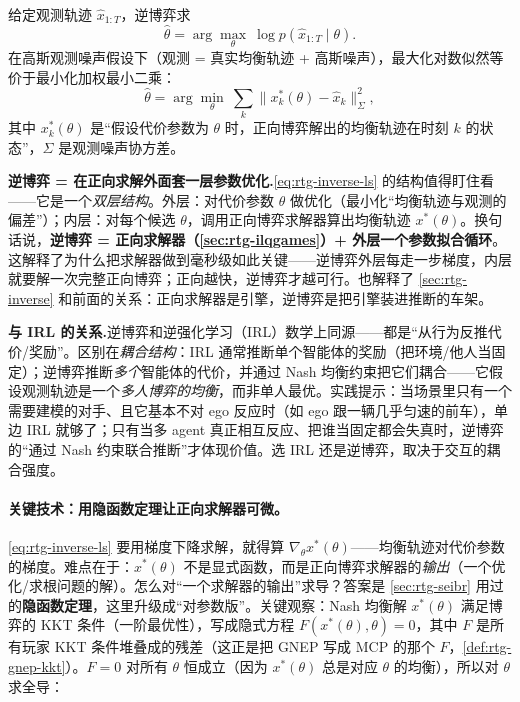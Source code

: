 \begin{definition}[逆博弈的最大似然形式]\label{def:rtg-inverse-mle}
给定观测轨迹 $\hat x_{1:T}$，逆博弈求
\begin{equation}
  \hat\theta=\arg\max_\theta\ \log p(\hat x_{1:T}\mid\theta).
  \label{eq:rtg-mle}
\end{equation}
在高斯观测噪声假设下（观测 = 真实均衡轨迹 + 高斯噪声），最大化对数似然等价于最小化加权最小二乘：
\begin{equation}
  \hat\theta=\arg\min_\theta\ \sum_k\big\lVert x_k^*(\theta)-\hat x_k\big\rVert_\Sigma^2,
  \label{eq:rtg-inverse-ls}
\end{equation}
其中 $x_k^*(\theta)$ 是“假设代价参数为 $\theta$ 时，正向博弈解出的均衡轨迹在时刻 $k$ 的状态”，$\Sigma$ 是观测噪声协方差。
\end{definition}

\begin{insight}
\textbf{逆博弈 = 在正向求解外面套一层参数优化.}\;\cref{eq:rtg-inverse-ls} 的结构值得盯住看——它是一个\emph{双层结构}。外层：对代价参数 $\theta$ 做优化（最小化“均衡轨迹与观测的偏差”）；内层：对每个候选 $\theta$，调用正向博弈求解器算出均衡轨迹 $x^*(\theta)$。换句话说，\textbf{逆博弈 = 正向求解器（\cref{sec:rtg-ilqgames}）+ 外层一个参数拟合循环}。这解释了为什么把求解器做到毫秒级如此关键——逆博弈外层每走一步梯度，内层就要解一次完整正向博弈；正向越快，逆博弈才越可行。也解释了 \cref{sec:rtg-inverse} 和前面的关系：正向求解器是引擎，逆博弈是把引擎装进推断的车架。
\end{insight}

\begin{note}
\textbf{与 IRL 的关系.}\;逆博弈和逆强化学习（IRL）数学上同源——都是“从行为反推代价/奖励”。区别在\emph{耦合结构}：IRL 通常推断单个智能体的奖励（把环境/他人当固定）；逆博弈推断\emph{多个}智能体的代价，并通过 Nash 均衡约束把它们耦合——它假设观测轨迹是一个\emph{多人博弈的均衡}，而非单人最优。实践提示：当场景里只有一个需要建模的对手、且它基本不对 ego 反应时（如 ego 跟一辆几乎匀速的前车），单边 IRL 就够了；只有当多 agent 真正相互反应、把谁当固定都会失真时，逆博弈的“通过 Nash 约束联合推断”才体现价值。选 IRL 还是逆博弈，取决于交互的耦合强度。
\end{note}

\paragraph{关键技术：用隐函数定理让正向求解器可微。}
\cref{eq:rtg-inverse-ls} 要用梯度下降求解，就得算 $\nabla_\theta x^*(\theta)$——均衡轨迹对代价参数的梯度。难点在于：$x^*(\theta)$ 不是显式函数，而是正向博弈求解器的\emph{输出}（一个优化/求根问题的解）。怎么对“一个求解器的输出”求导？答案是 \cref{sec:rtg-seibr} 用过的\textbf{隐函数定理}，这里升级成“对参数版”。关键观察：Nash 均衡解 $x^*(\theta)$ 满足博弈的 KKT 条件（一阶最优性），写成隐式方程 $F(x^*(\theta),\theta)=0$，其中 $F$ 是所有玩家 KKT 条件堆叠成的残差（这正是把 GNEP 写成 MCP 的那个 $F$，\cref{def:rtg-gnep-kkt}）。$F=0$ 对所有 $\theta$ 恒成立（因为 $x^*(\theta)$ 总是对应 $\theta$ 的均衡），所以对 $\theta$ 求全导：

